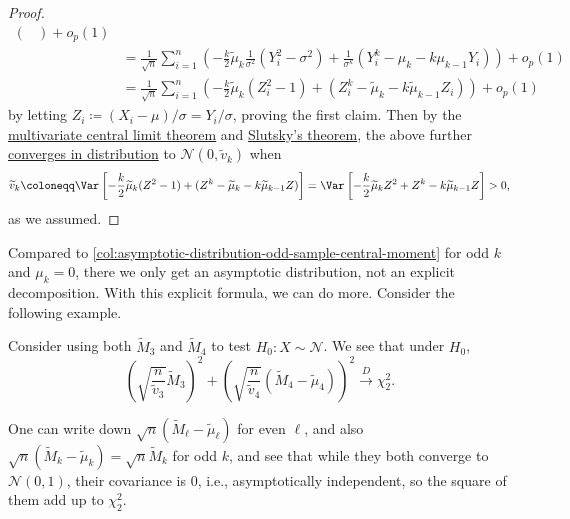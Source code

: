 \begin{proof}
\[\begin{split}
\begin{pmatrix}
			                                                                    \end{pmatrix} + o_p(1)                                                                                             \\
			 & = \frac{1}{\sqrt{n} } \sum_{i=1}^{n} \left( -\frac{k}{2} \widetilde{\mu} _k \frac{1}{\sigma ^2} (Y_i^2 - \sigma ^2) + \frac{1}{\sigma ^k} (Y_i^k - \mu _k - k \mu _{k-1} Y_i) \right) + o_p(1) \\
			 & = \frac{1}{\sqrt{n} } \sum_{i=1}^{n} \left( -\frac{k}{2} \widetilde{\mu} _k (Z_i^2 - 1) + (Z_i^k - \widetilde{\mu} _k - k \widetilde{\mu} _{k-1} Z_i ) \right) + o_p(1)
		\end{split}
	\]
	by letting \(Z_i \coloneqq (X_i - \mu) / \sigma = Y_i / \sigma \), proving the first claim. Then by the \hyperref[thm:multivariate-CLT]{multivariate central limit theorem} and \hyperref[col:Slutsky]{Slutsky's theorem}, the above further \hyperref[def:converge-in-distribution]{converges in distribution} to \(\mathcal{N} (0, \widetilde{v} _k)\) when
	\[
		\widetilde{v} _k
		\coloneqq \Var_{}\left[-\frac{k}{2} \widetilde{\mu} _k (Z^2 - 1) + (Z^k - \widetilde{\mu} _k - k \widetilde{\mu} _{k-1} Z ) \right]
		= \Var_{}\left[-\frac{k}{2} \widetilde{\mu} _k Z^2 + Z^k - k \widetilde{\mu} _{k-1} Z \right] > 0,
	\]
	as we assumed.
\end{proof}

Compared to \autoref{col:asymptotic-distribution-odd-sample-central-moment} for odd \(k\) and \(\mu _k = 0\), there we only get an asymptotic distribution, not an explicit decomposition. With this explicit formula, we can do more. Consider the following example.

\begin{eg}
	Consider using both \(\widetilde{M} _3\) and \(\widetilde{M} _4\) to test \(H_0\colon X \sim \mathcal{N} \). We see that under \(H_0\),
	\[
		\left( \sqrt{\frac{n}{\widetilde{v} _3}} \widetilde{M} _3 \right) ^2 + \left( \sqrt{\frac{n}{\widetilde{v} _4}} (\widetilde{M} _4 - \widetilde{\mu} _4) \right) ^2
		\overset{D}{\to} \chi _2^2 .
	\]
\end{eg}
\begin{explanation}
	One can write down \(\sqrt{n} (\widetilde{M} _\ell - \widetilde{\mu} _\ell )\) for even \(\ell \), and also \(\sqrt{n} (\widetilde{M} _k - \widetilde{\mu} _k)= \sqrt{n} \widetilde{M} _k\) for odd \(k\), and see that while they both converge to \(\mathcal{N} (0, 1)\), their covariance is \(0\), i.e., asymptotically independent, so the square of them add up to \(\chi _2^2\).
\end{explanation}

